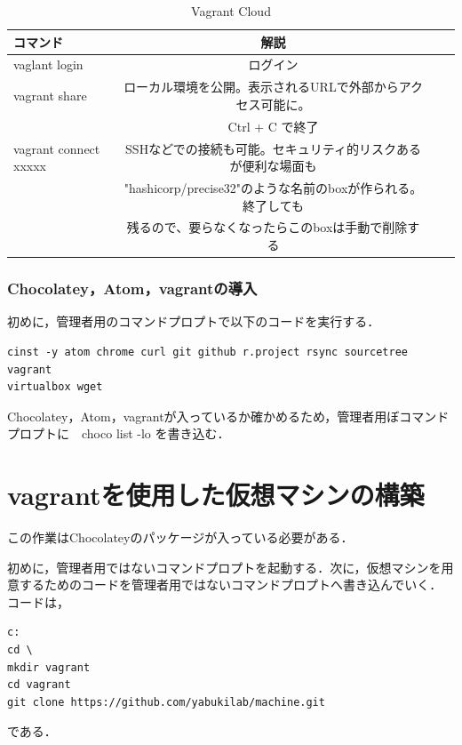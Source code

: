\begin{table}[htb]
	\begin{center}
		 \caption{Vagrant Cloud}
 			\begin{tabular}{|l|c|r||r|} \hline
				コマンド & 解説  \\ \hline \hline
				vaglant login & ログイン \\ \hline
				vagrant share & ローカル環境を公開。表示されるURLで外部からアクセス可能に。 \\
				                              & Ctrl + C で終了 \\ \hline
				vagrant connect xxxxx & SSHなどでの接続も可能。セキュリティ的リスクあるが便利な場面も \\
				                                 & "hashicorp/precise32"のような名前のboxが作られる。終了しても \\
				                                 & 残るので、要らなくなったらこのboxは手動で削除する \\ \hline
			\end{tabular}
	 \end{center}
\end{table}

\clearpage

\subsubsection*{Chocolatey，Atom，vagrantの導入}
初めに，管理者用のコマンドプロプトで以下のコードを実行する．
	\begin{verbatim}
cinst -y atom chrome curl git github r.project rsync sourcetree vagrant 
virtualbox wget
	\end{verbatim}
Chocolatey，Atom，vagrantが入っているか確かめるため，管理者用ぼコマンドプロプトに　choco list -lo を書き込む．

\section{vagrantを使用した仮想マシンの構築}
この作業はChocolateyのパッケージが入っている必要がある．

初めに，管理者用ではないコマンドプロプトを起動する．次に，仮想マシンを用意するためのコードを管理者用ではないコマンドプロプトへ書き込んでいく．
コードは，
	\begin{verbatim}
c:
cd \
mkdir vagrant
cd vagrant
git clone https://github.com/yabukilab/machine.git
	\end{verbatim}
である．

